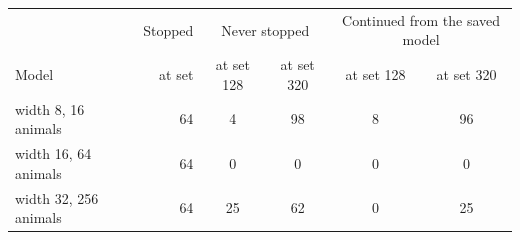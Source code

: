 \begin{tabular}{@{}lrcccc@{}}
\toprule
 & Stopped & \multicolumn{2}{c}{Never stopped} & \multicolumn{2}{c}{Continued from the saved model} \\
Model & at set & at set 128 & at set 320 & at set 128 & at set 320 \\
\midrule
width 8, 16 animals & 64 & 4 & 98 & 8 & 96 \\
width 16, 64 animals & 64 & 0 & 0 & 0 & 0 \\
width 32, 256 animals & 64 & 25 & 62 & 0 & 25 \\
\bottomrule
\end{tabular}

